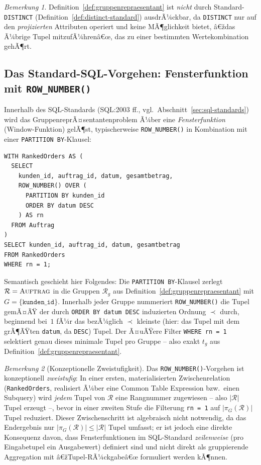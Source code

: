 ﻿\documentclass[a4paper,12pt]{report}
\theoremstyle{definition}
\theoremstyle{remark}
\newtheorem{remark}{Bemerkung}[chapter]
\newcommand{\R}{\mathcal{R}}
\begin{document}
\begin{remark}
Definition~\ref{def:gruppenrepraesentant} ist \emph{nicht} durch
Standard-\texttt{DISTINCT} (Definition~\ref{def:distinct-standard})
ausdrÃ¼ckbar, da \texttt{DISTINCT} nur auf den
\emph{projizierten} Attributen operiert und keine MÃ¶glichkeit bietet,
â€ždas Ã¼brige Tupel mitzufÃ¼hrenâ€œ, das zu einer bestimmten
Wertekombination gehÃ¶rt.
\end{remark}

\subsection{Das Standard-SQL-Vorgehen: Fensterfunktion mit \texttt{ROW\_NUMBER()}}
\label{sec:row-number}

Innerhalb des SQL-Standards (SQL:2003 ff., vgl.\
Abschnitt~\ref{sec:sql-standards}) wird das
GruppenreprÃ¤sentantenproblem Ã¼ber eine \emph{Fensterfunktion}
(Window-Funktion) gelÃ¶st, typischerweise \texttt{ROW\_NUMBER()} in
Kombination mit einer \texttt{PARTITION BY}-Klausel:

\begin{lstlisting}
WITH RankedOrders AS (
  SELECT
    kunden_id, auftrag_id, datum, gesamtbetrag,
    ROW_NUMBER() OVER (
      PARTITION BY kunden_id
      ORDER BY datum DESC
    ) AS rn
  FROM Auftrag
)
SELECT kunden_id, auftrag_id, datum, gesamtbetrag
FROM RankedOrders
WHERE rn = 1;
\end{lstlisting}

Semantisch geschieht hier Folgendes: Die \texttt{PARTITION
BY}-Klausel zerlegt $\R=\textsc{Auftrag}$ in die Gruppen $\R_g$ aus
Definition~\ref{def:gruppenrepraesentant} mit
$G=\{\texttt{kunden\_id}\}$. Innerhalb jeder Gruppe nummeriert
\texttt{ROW\_NUMBER()} die Tupel gemÃ¤ÃŸ der durch \texttt{ORDER BY
datum DESC} induzierten Ordnung $\prec$ durch, beginnend bei~$1$ fÃ¼r
das bezÃ¼glich $\prec$ kleinste (hier: das Tupel mit dem grÃ¶ÃŸten
\texttt{datum}, da \texttt{DESC}) Tupel. Der Ã¤uÃŸere Filter
\texttt{WHERE rn = 1} selektiert genau dieses minimale Tupel pro
Gruppe -- also exakt $t_g$ aus
Definition~\ref{def:gruppenrepraesentant}.

\begin{remark}[Konzeptionelle Zweistufigkeit]
\label{rem:zweistufig}
Das \texttt{ROW\_NUMBER()}-Vorgehen ist konzeptionell
\emph{zweistufig}: In einer ersten, materialisierten
Zwischenrelation (\texttt{RankedOrders}, realisiert Ã¼ber eine
Common Table Expression bzw.\ einen Subquery) wird \emph{jedem}
Tupel von $\R$ eine Rangnummer zugewiesen -- also $|\R|$ Tupel
erzeugt --, bevor in einer zweiten Stufe die Filterung
\texttt{rn = 1} auf $|\pi_G(\R)|$ Tupel reduziert. Dieser
Zwischenschritt ist algebraisch nicht notwendig, da das Endergebnis
nur $|\pi_G(\R)|\leq|\R|$ Tupel umfasst; er ist jedoch eine direkte
Konsequenz davon, dass Fensterfunktionen im SQL-Standard
\emph{zeilenweise} (pro Eingabetupel ein Ausgabewert) definiert sind
und nicht direkt als gruppierende Aggregation mit â€žTupel-RÃ¼ckgabeâ€œ
formuliert werden kÃ¶nnen.
\end{remark}
\end{document}
